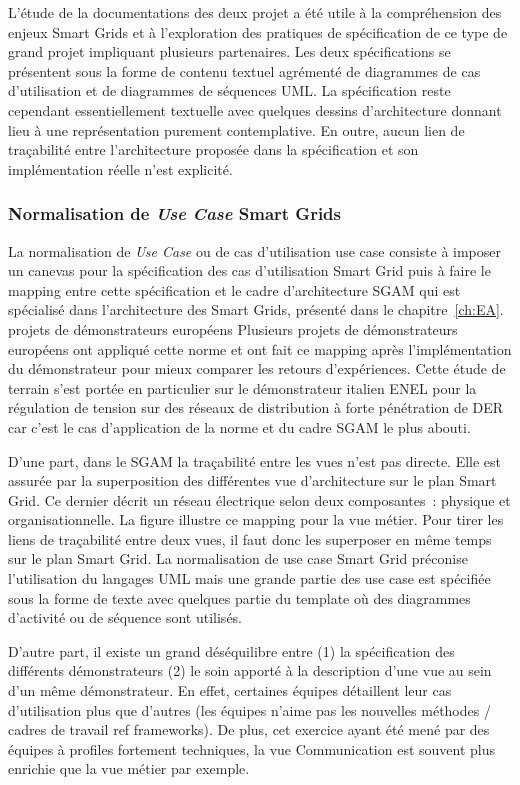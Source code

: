 L'étude de la documentations des deux projet a été utile à la compréhension des 
enjeux Smart Grids et à l'exploration des pratiques de spécification de ce type 
de grand projet impliquant plusieurs partenaires. Les deux spécifications se 
présentent sous la forme de contenu textuel agrémenté de diagrammes de cas 
d'utilisation et de diagrammes de séquences UML. La spécification reste 
cependant essentiellement textuelle avec quelques dessins d'architecture donnant 
lieu à une représentation purement contemplative. En outre, aucun lien de 
traçabilité entre l'architecture proposée dans la spécification et son 
implémentation réelle n'est explicité.
 
\subsubsection{Normalisation de \textit{Use Case} Smart Grids}

La normalisation de \textit{Use Case} ou de cas d'utilisation use case consiste 
à imposer un canevas pour la spécification des cas d'utilisation Smart Grid puis 
à faire le mapping entre cette spécification et le cadre d'architecture SGAM qui 
est spécialisé dans l'architecture des Smart Grids, présenté dans le 
chapitre~\ref{ch:EA}.  projets de démonstrateurs européens 
Plusieurs projets de démonstrateurs européens ont appliqué cette norme et ont 
fait ce mapping après l'implémentation du démonstrateur pour mieux comparer les 
retours d'expériences. Cette étude de terrain s'est portée en particulier sur le 
démonstrateur italien ENEL pour la régulation de tension sur des réseaux de 
distribution à forte pénétration de DER car c'est le cas d'application de la 
norme et du cadre SGAM le plus abouti. 

D'une part, dans le SGAM la traçabilité entre les vues n'est pas directe. Elle 
est assurée par la superposition des différentes vue d'architecture sur le plan 
Smart Grid. Ce dernier décrit un réseau électrique selon deux composantes~: 
physique et organisationnelle. La figure illustre ce mapping pour la vue métier. 
Pour tirer les liens de traçabilité entre deux vues, il faut donc les superposer 
en même temps sur le plan Smart Grid. La normalisation de use case Smart Grid 
préconise l'utilisation du langages UML mais une grande partie des use case est 
spécifiée sous la forme de texte avec quelques partie du template où des 
diagrammes d'activité ou de séquence sont utilisés. 

D'autre part, il existe un grand déséquilibre entre (1) la spécification des 
différents démonstrateurs (2) le soin apporté à la description d'une vue au sein 
d'un même démonstrateur. En effet, certaines équipes détaillent leur cas 
d'utilisation plus que d'autres (les équipes n'aime pas les nouvelles méthodes / 
cadres de travail ref frameworks).  De plus, cet exercice ayant été mené par des 
équipes à profiles fortement techniques, la vue Communication est souvent plus 
enrichie que la vue métier par exemple.  

